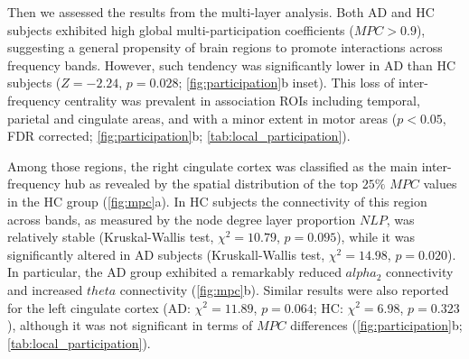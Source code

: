 Then we assessed the results from the multi-layer analysis. Both AD and HC subjects exhibited high global multi-participation coefficients ($MPC>0.9$), suggesting a general propensity of brain regions to promote interactions across frequency bands.
However, such tendency was significantly lower in AD than HC subjects ($Z=-2.24$, $p=0.028$; \autoref{fig:participation}b inset).
This loss of inter-frequency centrality was prevalent in association ROIs including temporal, parietal and cingulate areas, and with a minor extent in motor areas ($p<0.05$, FDR corrected; \autoref{fig:participation}b; \autoref{tab:local_participation}).

Among those regions, the right cingulate cortex was classified as the main inter-frequency hub as revealed by the spatial distribution of the top $25\%$ $MPC$ values in the HC group (\autoref{fig:mpc}a).
In HC subjects the connectivity of this region across bands, as measured by the node degree layer proportion $NLP$, was relatively stable (Kruskal-Wallis test, $\chi^2=10.79$, $p=0.095$), while it was significantly altered in AD subjects (Kruskall-Wallis test, $\chi^2=14.98$, $p=0.020$).
In particular, the AD group exhibited a remarkably reduced $alpha_2$ connectivity and increased $theta$ connectivity (\autoref{fig:mpc}b). Similar results were also reported for the left cingulate cortex (AD: $\chi^2=11.89$, $p=0.064$; HC: $\chi^2=6.98$, $p=0.323$), although it was not significant in terms of $MPC$ differences (\autoref{fig:participation}b; \autoref{tab:local_participation}).



